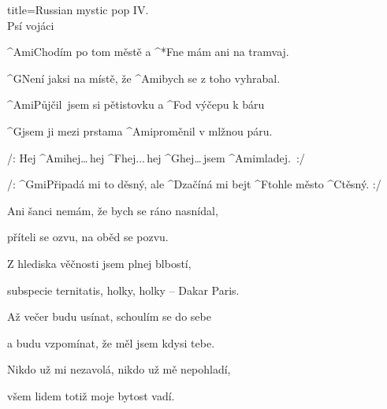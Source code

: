 \begin{song}{title=\predtitle\centering Russian mystic pop IV. \\\large Psí vojáci  \vspace*{-0.3cm}}  %
\begin{centerjustified}
\nejnejvetsi

\sloka 
	^{Ami\z}Chodím po tom městě a ^*{F\:}ne mám ani na tramvaj.

	^{G\z}Není jaksi na místě, že ^{Ami}bych se z toho vyhrabal.

	^{Ami\z}Půjčil~jsem si pětistovku a ^{F}od výčepu k báru

	^{G}jsem ji mezi prstama ^{{\z}Ami\:}proměnil v mlžnou páru.

	/: Hej ^{Ami\phantom{dddd}}hej\elipsa\dots\,hej ^{F\phantom{dddd}}hej\elipsa.\elipsa.\elipsa.\,hej ^{G\phantom{dddddd}}hej\elipsa\dots\,jsem ^{{\z}Ami\:\:}mladej.~:/

	 /: ^{Gmi{\z}}Připadá mi to děsný, ale ^{D{\z}}začíná mi bejt ^{F{\z}}tohle město ^{C{\z}}těsný. :/

\sloka
	Ani šanci nemám, že bych se ráno nasnídal,

	příteli se ozvu, na oběd se pozvu.

	Z hlediska věčnosti jsem plnej blbostí,

	subspecie ternitatis, holky, holky -- Dakar Paris.


\sloka
	Až večer budu usínat, schoulím se do sebe

	a budu vzpomínat, že měl jsem kdysi tebe.

	Nikdo už mi nezavolá, nikdo už mě nepohladí,

	všem lidem totiž moje bytost vadí.


\end{centerjustified}
\setcounter{Slokočet}{0}
\end{song}
